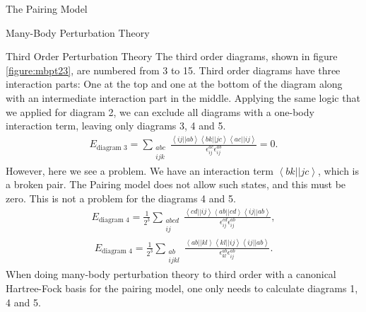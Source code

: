\documentclass[twoside,english]{uiofysmaster}
\begin{document}
\begin{chapter}{The Pairing Model}
\begin{section}{Many-Body Perturbation Theory}
		\begin{subsection}{Third Order Perturbation Theory}
			The third order diagrams, shown in figure
                        \ref{figure:mbpt23}, are numbered from 3 to
                        15. Third order diagrams have three
                        interaction parts: One at the top and one at
                        the bottom of the diagram along with an
                        intermediate interaction part in the
                        middle. Applying the same logic that we
                        applied for diagram 2, we can exclude all
                        diagrams with a one-body interaction term,
                        leaving only diagrams 3, 4 and 5.
			\begin{align}
				E_{\text{diagram 3}} = \sum_{\substack{abc \\ ijk}} \frac{\left<ij||ab\right>\left<bk||jc\right>\left<ac||ij\right>}{\epsilon_{ij}^{ac} \epsilon_{ij}^{ab}} = 0. 
			\end{align}
			However, here we see a problem. We have an interaction term $\left<bk||jc\right>$, which is a broken pair. The Pairing model does not allow such states, and this must be zero. This is not a problem for the diagrams 4 and 5. 
			\begin{align}
				E_{\text{diagram 4}} = \frac{1}{2^3} \sum_{\substack{abcd \\ ij}} \frac{\left<cd||ij\right>\left<ab||cd\right>\left<ij||ab\right>}{\epsilon_{ij}^{cd} \epsilon_{ij}^{ab}},
			\end{align}
			\begin{align}
				E_{\text{diagram 4}} = \frac{1}{2^3} \sum_{\substack{ab \\ ijkl}} \frac{\left<ab||kl\right>\left<kl||ij\right>\left<ij||ab\right>}{\epsilon_{kl}^{ab} \epsilon_{ij}^{ab}}.
			\end{align}
			When doing many-body perturbation theory to
                        third order with a canonical Hartree-Fock
                        basis for the pairing model, one only needs
                        to calculate diagrams 1, 4 and 5.

		\end{subsection}


\end{section}
\end{chapter}
\end{document}
